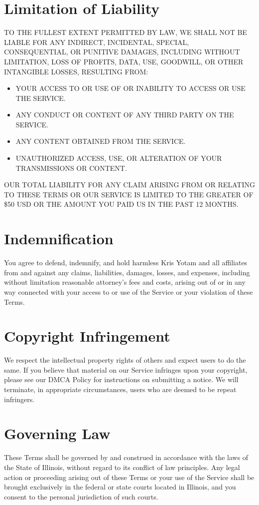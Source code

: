 \documentclass[11pt]{article}
\begin{document}
\section{Limitation of Liability}
TO THE FULLEST EXTENT PERMITTED BY LAW, WE SHALL NOT BE LIABLE FOR ANY INDIRECT, INCIDENTAL, SPECIAL, CONSEQUENTIAL, OR PUNITIVE DAMAGES, INCLUDING WITHOUT LIMITATION, LOSS OF PROFITS, DATA, USE, GOODWILL, OR OTHER INTANGIBLE LOSSES, RESULTING FROM:
\begin{itemize}
  \item YOUR ACCESS TO OR USE OF OR INABILITY TO ACCESS OR USE THE SERVICE.
  \item ANY CONDUCT OR CONTENT OF ANY THIRD PARTY ON THE SERVICE.
  \item ANY CONTENT OBTAINED FROM THE SERVICE.
  \item UNAUTHORIZED ACCESS, USE, OR ALTERATION OF YOUR TRANSMISSIONS OR CONTENT.
\end{itemize}

OUR TOTAL LIABILITY FOR ANY CLAIM ARISING FROM OR RELATING TO THESE TERMS OR OUR SERVICE IS LIMITED TO THE GREATER OF \$50 USD OR THE AMOUNT YOU PAID US IN THE PAST 12 MONTHS.

\section{Indemnification}
You agree to defend, indemnify, and hold harmless Kris Yotam and all affiliates from and against any claims, liabilities, damages, losses, and expenses, including without limitation reasonable attorney's fees and costs, arising out of or in any way connected with your access to or use of the Service or your violation of these Terms.

\section{Copyright Infringement}
We respect the intellectual property rights of others and expect users to do the same. If you believe that material on our Service infringes upon your copyright, please see our DMCA Policy for instructions on submitting a notice. We will terminate, in appropriate circumstances, users who are deemed to be repeat infringers.

\section{Governing Law}
These Terms shall be governed by and construed in accordance with the laws of the State of Illinois, without regard to its conflict of law principles. Any legal action or proceeding arising out of these Terms or your use of the Service shall be brought exclusively in the federal or state courts located in Illinois, and you consent to the personal jurisdiction of such courts.
\end{document}

